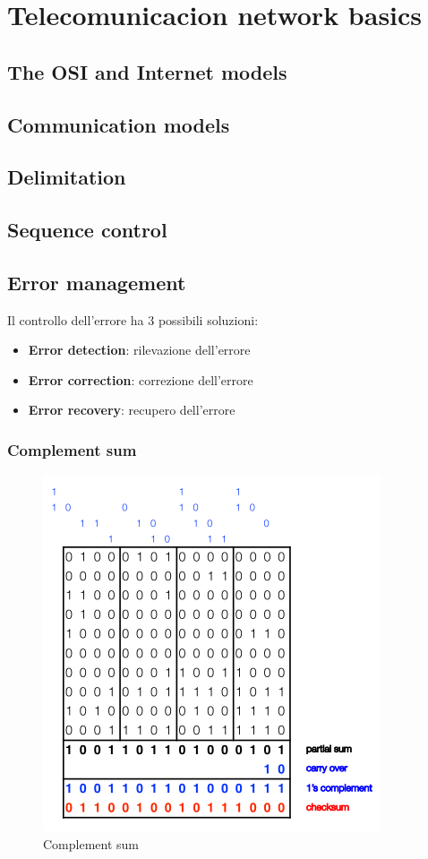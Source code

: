 \chapter{Telecomunicacion network basics}
\section{The OSI and Internet models}
\section{Communication models}
\section{Delimitation}
\section{Sequence control}
\section{Error management}

Il controllo dell'errore ha 3 possibili soluzioni:
\begin{itemize}
	\item \textbf{Error detection}: rilevazione dell'errore
	\item \textbf{Error correction}: correzione dell'errore
	\item \textbf{Error recovery}: recupero dell'errore
\end{itemize}


\subsection{Complement sum}

\begin{figure}[!ht]
	\centering
	\includegraphics[width=0.3\columnwidth]{./images/complement_sum.png}
	\caption{Complement sum}
	\label{fig:complement_sum}
\end{figure}

